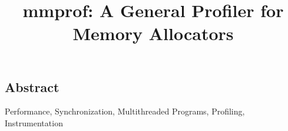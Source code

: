 \documentclass[preprint,10pt]{sigplanconf}
\begin{document}
\setlength{\pdfpageheight}{\paperheight}
\setlength{\pdfpagewidth}{\paperwidth}

\title{mmprof: A General Profiler for Memory Allocators}

\authorinfo{}


\maketitle

\subsection*{Abstract}



\keywords
Performance, Synchronization, Multithreaded Programs, Profiling, Instrumentation











{


}
\end{document}
